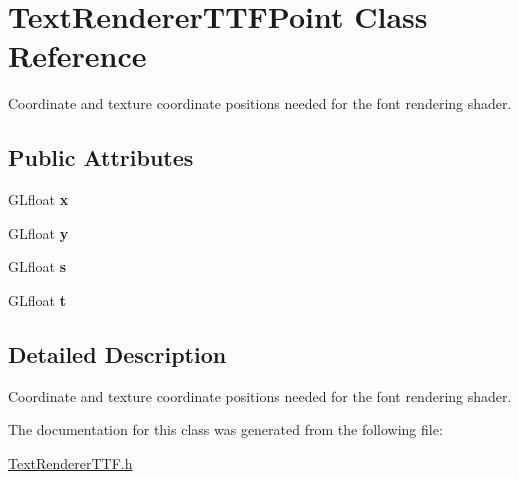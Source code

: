 \hypertarget{struct_text_renderer_t_t_f_point}{}\section{Text\+Renderer\+T\+T\+F\+Point Class Reference}
\label{struct_text_renderer_t_t_f_point}


Coordinate and texture coordinate positions needed for the font rendering shader.  


\subsection*{Public Attributes}
\begin{DoxyCompactItemize}
\item 
\mbox{\label{struct_text_renderer_t_t_f_point_afa4f5b8d476a192aa786517982074424}} 
G\+Lfloat {\bfseries x}
\item 
\mbox{\label{struct_text_renderer_t_t_f_point_af6e7039fcb759ae4f4295a087d8d0263}} 
G\+Lfloat {\bfseries y}
\item 
\mbox{\label{struct_text_renderer_t_t_f_point_a8d167f3918a792b8bd03b87a03357963}} 
G\+Lfloat {\bfseries s}
\item 
\mbox{\label{struct_text_renderer_t_t_f_point_a2b8b34c82add87f06ae204035a9d0d04}} 
G\+Lfloat {\bfseries t}
\end{DoxyCompactItemize}


\subsection{Detailed Description}
Coordinate and texture coordinate positions needed for the font rendering shader. 

The documentation for this class was generated from the following file\+:\begin{DoxyCompactItemize}
\item 
\hyperlink{_text_renderer_t_t_f_8h}{Text\+Renderer\+T\+T\+F.\+h}\end{DoxyCompactItemize}
